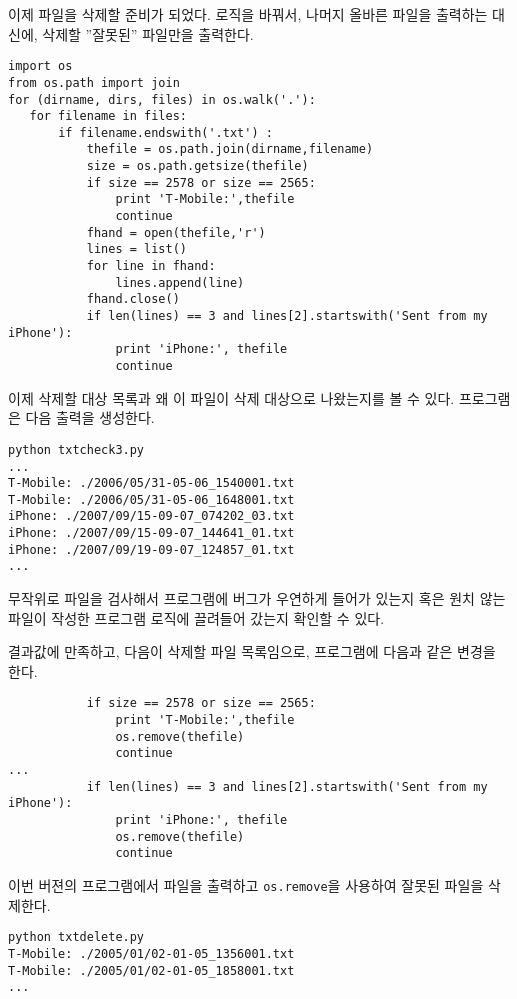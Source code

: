 이제 파일을 삭제할 준비가 되었다. 로직을 바꿔서, 나머지 올바른 파일을 출력하는 대신에,
삭제할 ''잘못된'' 파일만을 출력한다.

\beforeverb
\begin{verbatim}
import os
from os.path import join
for (dirname, dirs, files) in os.walk('.'):
   for filename in files:
       if filename.endswith('.txt') :
           thefile = os.path.join(dirname,filename)
           size = os.path.getsize(thefile)
           if size == 2578 or size == 2565:
               print 'T-Mobile:',thefile
               continue
           fhand = open(thefile,'r')
           lines = list()
           for line in fhand:
               lines.append(line)
           fhand.close()
           if len(lines) == 3 and lines[2].startswith('Sent from my iPhone'):
               print 'iPhone:', thefile
               continue
\end{verbatim}
\afterverb
%

이제 삭제할 대상 목록과 왜 이 파일이 삭제 대상으로 나왔는지를 볼 수 있다.
프로그램은 다음 출력을 생성한다.

\beforeverb
\begin{verbatim}
python txtcheck3.py
...
T-Mobile: ./2006/05/31-05-06_1540001.txt
T-Mobile: ./2006/05/31-05-06_1648001.txt
iPhone: ./2007/09/15-09-07_074202_03.txt
iPhone: ./2007/09/15-09-07_144641_01.txt
iPhone: ./2007/09/19-09-07_124857_01.txt
...
\end{verbatim}
\afterverb
%

무작위로 파일을 검사해서 프로그램에 버그가 우연하게 들어가 있는지 혹은 원치 않는 파일이 
작성한 프로그램 로직에 끌려들어 갔는지 확인할 수 있다.

결과값에 만족하고, 다음이 삭제할 파일 목록임으로, 프로그램에 다음과 같은 변경을 한다.

\beforeverb
\begin{verbatim}
           if size == 2578 or size == 2565:
               print 'T-Mobile:',thefile
               os.remove(thefile)
               continue
...
           if len(lines) == 3 and lines[2].startswith('Sent from my iPhone'):
               print 'iPhone:', thefile
               os.remove(thefile)
               continue
\end{verbatim}
\afterverb
%

이번 버젼의 프로그램에서 파일을 출력하고 {\tt os.remove}을 사용하여 잘못된 파일을 삭제한다.

\beforeverb
\begin{verbatim}
python txtdelete.py 
T-Mobile: ./2005/01/02-01-05_1356001.txt
T-Mobile: ./2005/01/02-01-05_1858001.txt
...
\end{verbatim}
\afterverb
%

